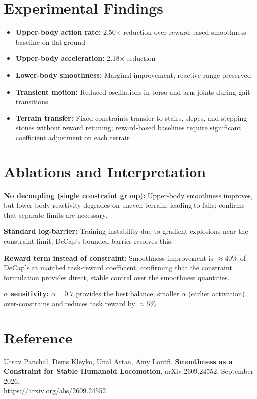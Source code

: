 \documentclass[10pt,twocolumn]{article}
\begin{document}
\section{Experimental Findings}

\begin{itemize}[itemsep=2pt,parsep=0pt]
  \item \textbf{Upper-body action rate:} 2.50$\times$ reduction over
    reward-based smoothness baseline on flat ground
  \item \textbf{Upper-body acceleration:} 2.18$\times$ reduction
  \item \textbf{Lower-body smoothness:} Marginal improvement;
    reactive range preserved
  \item \textbf{Transient motion:} Reduced oscillations in torso and
    arm joints during gait transitions
  \item \textbf{Terrain transfer:} Fixed constraints transfer to stairs,
    slopes, and stepping stones without reward retuning; reward-based
    baselines require significant coefficient adjustment on each terrain
\end{itemize}

\section{Ablations and Interpretation}

\textbf{No decoupling (single constraint group):} Upper-body smoothness
improves, but lower-body reactivity degrades on uneven terrain, leading
to falls; confirms that separate limits are necessary.

\textbf{Standard log-barrier:} Training instability due to gradient
explosions near the constraint limit; DeCap's bounded barrier resolves this.

\textbf{Reward term instead of constraint:} Smoothness improvement is
$\approx$40\% of DeCap's at matched task-reward coefficient, confirming
that the constraint formulation provides direct, stable control over the
smoothness quantities.

\textbf{$\alpha$ sensitivity:} $\alpha=0.7$ provides the best balance;
smaller $\alpha$ (earlier activation) over-constrains and reduces
task reward by $\approx 5\%$.

\section*{Reference}

Utsav Panchal, Denis Kleyko, Unal Artan, Amy Loutfi.
\textbf{Smoothness as a Constraint for Stable Humanoid Locomotion}.
arXiv:2609.24552, September 2026.\\
\url{https://arxiv.org/abs/2609.24552}
\end{document}
